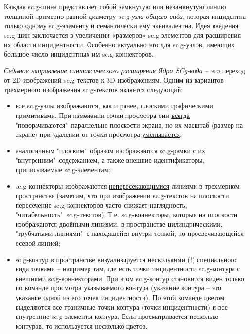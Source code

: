 Каждая sc.g-шина представляет собой замкнутую или незамкнутую линию толщиной примерно равной диаметру \textit{sc.g-узла общего вида}, которая инцидентна только одному sc.g-элементу и семантически ему эквивалентна. Идея введения sc.g-шин заключается в увеличении «размеров» sc.g-элементов для расширения их области инцидентности. Особенно актуально это для sc.g-узлов, имеющих большое число инцидентных им sc.g-коннекторов.

\begin{SCn}
\end{SCn}
	
\textit{Седьмое направление синтаксического расширения Ядра SCg-кода} -- это переход от 2D-изображений sc.g-текстов к 3D-изображениям.
Одним из вариантов трехмерного изображения sc.g-текстов является следующий:

\begin{itemize}
	\item все sc.g-узлы изображаются, как и ранее, \uline{плоскими} графическими примитивами. При изменении точки просмотра они \uline{всегда} "поворачиваются"\ параллельно плоскости экрана, но их масштаб (размер на экране) при удалении от  точки просмотра \uline{уменьшается};
	\item аналогичным "плоским"\ образом изображаются sc.g-рамки с их "внутренним"\ содержанием, а также внешние идентификаторы, приписываемые sc.g-элементам;
	\item sc.g-коннекторы изображаются \uline{непересекающимися} линиями в трехмерном пространстве (заметим, что при изображении sc.g-текстов на плоскости пересечение sc.g-коннекторов часто снижает наглядность, "читабельность"\ sc.g-текстов). Т.е. sc.g-коннекторы, которые на плоскости изображаются двойными линиями, в пространстве  цилиндрическими, "трубчатыми линиями"\ с находящейся внутри тонкой, но просвечивающейся осевой линией;
	\item sc.g-контур в пространстве визуализируется несколькими (!) специального вида точками -- например там, где есть точки инцидентности sc.g-контура с \uline{внешними} sc.g-коннекторами. При этом sc.g-контур становится виден только по команде просмотра указываемого контура (указание контура – это указание одной из его точек инцидентности). По этой команде цветом выделяются все граничные точки контура (точки инцидентности) и все внутренние sc.g-элементы контура. Если просматривается  несколько контуров, то используется несколько цветов.
\end{itemize}

